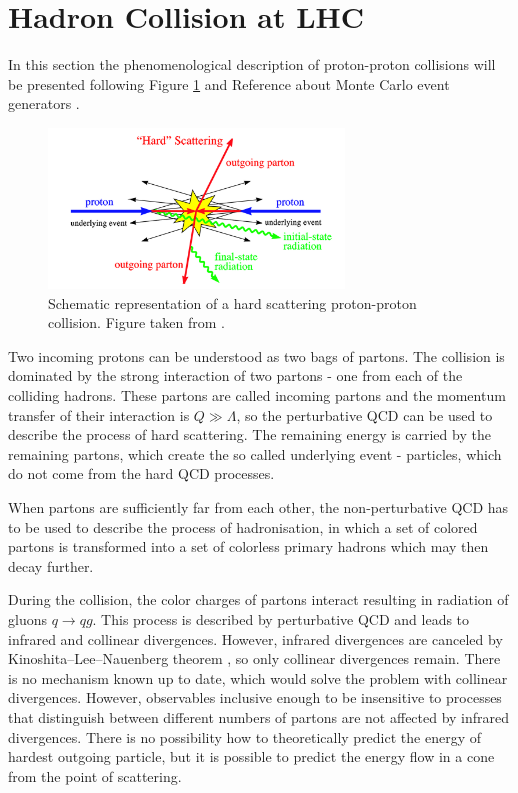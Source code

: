 \section{Hadron Collision at LHC}

In this section the phenomenological description of proton-proton collisions
will be presented following Figure \ref{fig:HardProcess} and
Reference about Monte Carlo event generators \cite{PDG}.

\begin{figure}[t]
  \centering
  \includegraphics[width=0.7\textwidth]{Chapter2/HardProcess.png}
  \caption[Schematic representation of a hard scattering proton-proton
          collision.]
          {Schematic representation of a hard scattering proton-proton
          collision. Figure taken from \cite{HardProcess}.}
  \label{fig:HardProcess}
\end{figure}

Two incoming protons can be understood as two bags of partons. The collision is
dominated by the strong interaction of two partons - one from each of the
colliding hadrons. These partons are called incoming partons and the
momentum transfer of their interaction is $Q \gg \Lambda$, so the perturbative
QCD can be used to describe the process of hard scattering. The remaining energy
is carried by the remaining partons, which create the so called underlying event -
particles, which do not come from the hard QCD processes.

When partons are sufficiently far from each other, the non-perturbative QCD has to
be used to describe the process of hadronisation, in which a set of colored
partons is transformed into a set of colorless primary hadrons which may then
decay further. 

During the collision, the color charges of partons interact resulting in
radiation of gluons $q \rightarrow qg$. This process is described by
perturbative QCD and leads to infrared and collinear divergences. However,
infrared divergences are
canceled by Kinoshita--Lee--Nauenberg theorem \cite{KLN1,KLN2}, so only
collinear divergences remain. There is no mechanism known up to date, which
would solve the problem with collinear divergences. However, observables
inclusive enough to be insensitive to processes that distinguish between
different numbers of partons are not affected by infrared divergences.
There is no possibility how to theoretically predict the energy of hardest
outgoing particle, but it is possible to predict the energy flow in a cone from
the point of scattering.


